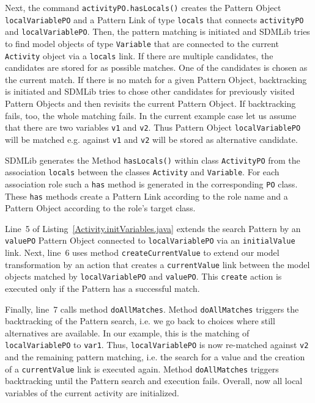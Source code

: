 \documentclass[submission,copyright,creativecommons]{eptcs}
\begin{document}
Next, the command \texttt{activityPO.hasLocals()} creates the Pattern Object 
\texttt{localVariablePO} and a Pattern Link of type \texttt{locals} that connects 
\texttt{activityPO} and \texttt{localVariablePO}. Then, the pattern matching is 
initiated and SDMLib tries to find model objects of type \texttt{Variable}
that are connected to the current \texttt{Activity} object via a \texttt{locals} link. 
If there are multiple candidates, the candidates are stored for as possible matches. 
One of the candidates is chosen as the current match. 
If there is no match for a given Pattern Object, backtracking is initiated and SDMLib 
tries to chose other candidates for previously visited Pattern Objects and then revisits
the current Pattern Object. If backtracking fails, too, the whole matching fails. 
In the current example case let us assume that there are two variables \texttt{v1} and \texttt{v2}. Thus Pattern Object \texttt{localVariablePO} will be matched e.g. against \texttt{v1} and \texttt{v2} will be stored as alternative candidate. 

SDMLib generates the Method \texttt{hasLocals()} within class \texttt{ActivityPO} from the association \texttt{locals} 
between the classes \texttt{Activity} and \texttt{Variable}. For each association role such a \texttt{has} method is generated in the corresponding \texttt{PO} class. These \texttt{has} methods create a Pattern Link according to the role name and a Pattern Object according 
to the role's target class. 

Line~5 of Listing~\ref{Activity.initVariables.java} extends the search Pattern by an \texttt{valuePO} Pattern Object connected to \texttt{localVariablePO} via an \texttt{initialValue} link. Next, line~6 uses method \texttt{createCurrentValue} to extend our model transformation by an action that creates a \texttt{currentValue} link between the model objects matched by \texttt{localVariablePO} and \texttt{valuePO}. This \texttt{create} action is executed only if the Pattern has a successful match. 

Finally, line~7 calls method \texttt{doAllMatches}. Method \texttt{doAllMatches} triggers 
the backtracking of the Pattern search, i.e. we go back to choices where still alternatives 
are available. In our example, this is the matching of \texttt{localVariablePO} to 
\texttt{var1}. Thus, \texttt{localVariablePO} is now re-matched against \texttt{v2} and the 
remaining pattern matching, i.e. the search for a value and the creation of a 
\texttt{currentValue} link is executed again. Method \texttt{doAllMatches} triggers backtracking until the Pattern search and execution fails. Overall, now all local variables of the current activity are initialized.  
\end{document}
